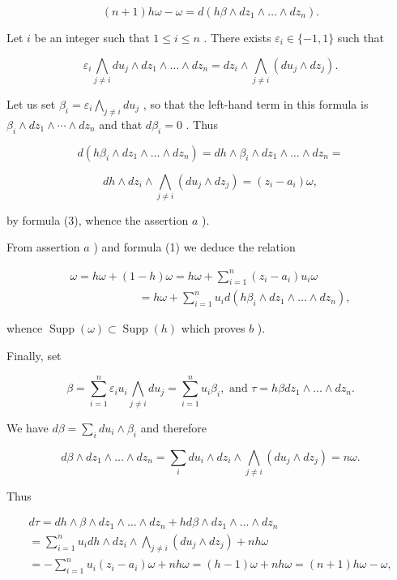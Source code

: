 \[
(n + 1) h \omega - \omega = d (h \beta \wedge d z _ {1} \wedge \dots \wedge d z _ {n}).
\]

Let \(i\) be an integer such that \(1 \leqslant i \leqslant n\) . There exists \(\varepsilon_i \in \{-1, 1\}\) such that

\[
\varepsilon_ {i} \bigwedge_ {j \neq i} d u _ {j} \wedge d z _ {1} \wedge \dots \wedge d z _ {n} = d z _ {i} \wedge \bigwedge_ {j \neq i} (d u _ {j} \wedge d z _ {j}).
\]

Let us set \(\beta_{i} = \varepsilon_{i} \bigwedge_{j \neq i} du_{j}\) , so that the left-hand term in this formula is \(\beta_{i} \wedge dz_{1} \wedge \cdots \wedge dz_{n}\) and that \(d\beta_{i} = 0\) . Thus

\[
d \left(h \beta_ {i} \wedge d z _ {1} \wedge \dots \wedge d z _ {n}\right) = d h \wedge \beta_ {i} \wedge d z _ {1} \wedge \dots \wedge d z _ {n} =
\]

\[
d h \wedge d z _ {i} \wedge \bigwedge_ {j \neq i} (d u _ {j} \wedge d z _ {j}) = (z _ {i} - a _ {i}) \omega ,
\]

by formula (3), whence the assertion \(a\) ).

From assertion \(a\) ) and formula (1) we deduce the relation

\[
\begin{array}{l} \omega = h \omega + (1 - h) \omega = h \omega + \sum_ {i = 1} ^ {n} (z _ {i} - a _ {i}) u _ {i} \omega \\ \qquad \qquad \qquad = h \omega + \sum_ {i = 1} ^ {n} u _ {i}   d (h \beta_ {i} \wedge d z _ {1} \wedge \dots \wedge d z _ {n}), \end{array}
\]

whence \(\operatorname{Supp}(\omega) \subset \operatorname{Supp}(h)\) which proves \(b\) ).

Finally, set

\[
\beta = \sum_ {i = 1} ^ {n} \varepsilon_ {i} u _ {i} \bigwedge_ {j \neq i} d u _ {j} = \sum_ {i = 1} ^ {n} u _ {i} \beta_ {i}, \text {   and   } \tau = h \beta d z _ {1} \wedge \dots \wedge d z _ {n}.
\]

We have \(d\beta = \sum_{i}du_{i}\wedge \beta_{i}\) and therefore

\[
d \beta \wedge d z _ {1} \wedge \dots \wedge d z _ {n} = \sum_ {i} d u _ {i} \wedge d z _ {i} \wedge \bigwedge_ {j \neq i} (d u _ {j} \wedge d z _ {j}) = n \omega .
\]

Thus

\[
\begin{array}{l} d \tau = d h \wedge \beta \wedge d z _ {1} \wedge \dots \wedge d z _ {n} + h d \beta \wedge d z _ {1} \wedge \dots \wedge d z _ {n} \\ = \sum_ {i = 1} ^ {n} u _ {i} d h \wedge d z _ {i} \wedge \bigwedge_ {j \neq i} (d u _ {j} \wedge d z _ {j}) + n h \omega \\ = - \sum_ {i = 1} ^ {n} u _ {i} (z _ {i} - a _ {i}) \omega + n h \omega = (h - 1) \omega + n h \omega = (n + 1) h \omega - \omega , \end{array}
\]

